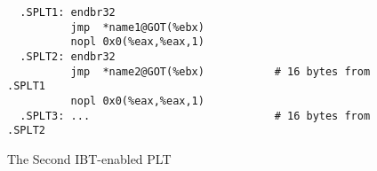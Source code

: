 \begin{figure}[H]
\Hrule
\caption{The Second IBT-enabled PLT}
\label{ibt_sec_plt}
\begin{footnotesize}
\begin{verbatim}
  .SPLT1: endbr32
          jmp  *name1@GOT(%ebx)
          nopl 0x0(%eax,%eax,1)
  .SPLT2: endbr32
          jmp  *name2@GOT(%ebx)           # 16 bytes from .SPLT1
          nopl 0x0(%eax,%eax,1)
  .SPLT3: ...                             # 16 bytes from .SPLT2
\end{verbatim}%
\end{footnotesize}
\Hrule
\end{figure}
